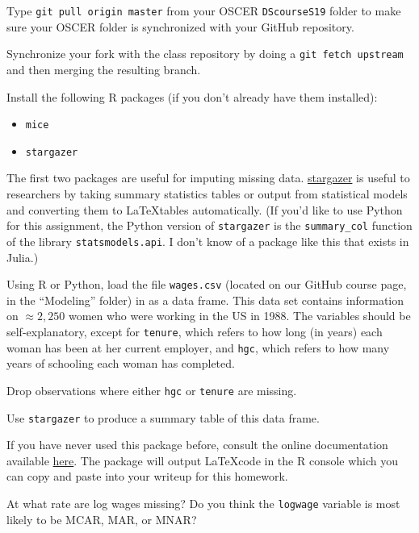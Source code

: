 \documentclass[12pt,english]{exam}
\begin{document}
\begin{questions}
\question Type \texttt{git pull origin master} from your OSCER \texttt{DScourseS19} folder to make sure your OSCER folder is synchronized with your GitHub repository. 

\question Synchronize your fork with the class repository by doing a \texttt{git fetch upstream} and then merging the resulting branch. 

\question Install the following R packages (if you don't already have them installed):
\begin{itemize}
    \item \texttt{mice}
    \item \texttt{stargazer}
\end{itemize}

The first two packages are useful for imputing missing data.
\href{https://cran.r-project.org/web/packages/stargazer/vignettes/stargazer.pdf}{stargazer} is useful to researchers by taking summary statistics tables or output from statistical models and converting them to \LaTeX tables automatically. (If you'd like to use Python for this assignment, the Python version of \texttt{stargazer} is the \texttt{summary\_col} function of the library \texttt{statsmodels.api}. I don't know of a package like this that exists in Julia.)

\question Using R or Python, load the file \texttt{wages.csv} (located on our GitHub course page, in the ``Modeling'' folder) in as a data frame. This data set contains information on $\approx 2,250$ women who were working in the US in 1988. The variables should be self-explanatory, except for \texttt{tenure}, which refers to how long (in years) each woman has been at her current employer, and \texttt{hgc}, which refers to how many years of schooling each woman has completed.

\question Drop observations where either \texttt{hgc} or \texttt{tenure} are missing.

\question Use \texttt{stargazer} to produce a summary table of this data frame.

If you have never used this package before, consult the online documentation available \href{https://cran.r-project.org/web/packages/stargazer/vignettes/stargazer.pdf}{here}. The package will output \LaTeX code in the R console which you can copy and paste into your writeup for this homework. 

At what rate are log wages missing? Do you think the \texttt{logwage} variable is most likely to be MCAR, MAR, or MNAR?


\end{questions}
\end{document}
